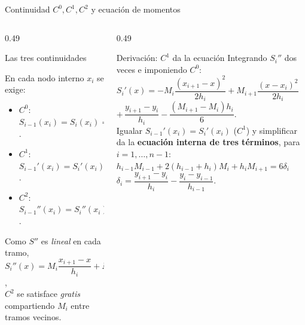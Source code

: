\documentclass[aspectratio=169,10pt]{beamer}
\begin{document}
\begin{frame}{Continuidad $C^0,C^1,C^2$ y ecuación de momentos}
\begin{columns}[T]
\begin{column}{0.49\textwidth}
\begin{cardidea}{Las tres continuidades}{\faSuperscript}
{\footnotesize En cada nodo interno $x_i$ se exige:
\begin{itemize}\setlength{\itemsep}{0.3mm}
\item $C^0$: $S_{i-1}(x_i)=S_i(x_i)=y_i$.
\item $C^1$: $S_{i-1}'(x_i)=S_i'(x_i)$.
\item $C^2$: $S_{i-1}''(x_i)=S_i''(x_i)=:M_i$.
\end{itemize}
Como $S''$ es \emph{lineal} en cada tramo,\\[0.4mm]
$S_i''(x)=M_i\dfrac{x_{i+1}-x}{h_i}+M_{i+1}\dfrac{x-x_i}{h_i}$,\\[0.4mm]
$C^2$ se satisface \emph{gratis} compartiendo $M_i$ entre tramos vecinos.}
\end{cardidea}
\end{column}
\begin{column}{0.49\textwidth}
\begin{cardgear}{Derivación: $C^1$ da la ecuación}{\faCogs}
{\footnotesize Integrando $S_i''$ dos veces e imponiendo $C^0$:\\[0.4mm]
$S_i'(x)=-M_i\dfrac{(x_{i+1}-x)^2}{2h_i}+M_{i+1}\dfrac{(x-x_i)^2}{2h_i}$\\[0.2mm]
\hspace{10mm}$+\,\dfrac{y_{i+1}-y_i}{h_i}-\dfrac{(M_{i+1}-M_i)h_i}{6}$.\\[1.0mm]
Igualar $S_{i-1}'(x_i)=S_i'(x_i)$ ($C^1$) y simplificar da la \textbf{ecuación interna de tres términos}, para $i=1,\dots,n-1$:\\[0.6mm]
$\boxed{h_{i-1}M_{i-1}+2(h_{i-1}{+}h_i)M_i+h_iM_{i+1}=6\delta_i}$\\[0.6mm]
$\delta_i=\dfrac{y_{i+1}-y_i}{h_i}-\dfrac{y_i-y_{i-1}}{h_{i-1}}$.}
\end{cardgear}
\end{column}
\end{columns}
\end{frame}
\end{document}
